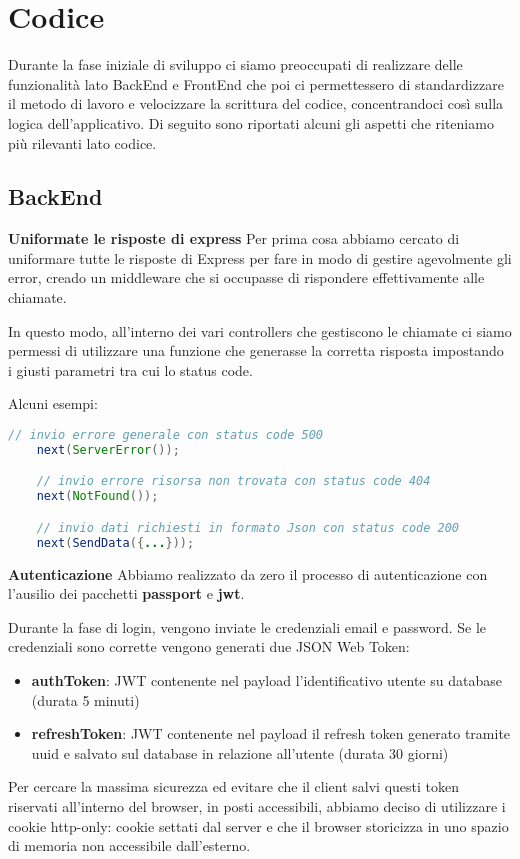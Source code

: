 \section{Codice}
Durante la fase iniziale di sviluppo ci siamo preoccupati di realizzare delle funzionalità lato BackEnd e FrontEnd 
che poi ci permettessero di standardizzare il metodo di lavoro e velocizzare la scrittura del codice,
concentrandoci così sulla logica dell'applicativo.
\bigbreak
\noindent
Di seguito sono riportati alcuni gli aspetti che riteniamo più rilevanti lato codice.

\subsection{BackEnd}

\textbf{Uniformate le risposte di express}
\bigbreak
\noindent
Per prima cosa abbiamo cercato di uniformare tutte le risposte di Express per fare in modo di gestire agevolmente gli error, 
creado un middleware che si occupasse di rispondere effettivamente alle chiamate.

In questo modo, all'interno dei vari controllers che gestiscono le chiamate ci siamo permessi di utilizzare una funzione 
che generasse la corretta risposta impostando i giusti parametri tra cui lo status code.

Alcuni esempi: 

\begin{lstlisting}[language=java]
	// invio errore generale con status code 500
	next(ServerError()); 

	// invio errore risorsa non trovata con status code 404
	next(NotFound());

	// invio dati richiesti in formato Json con status code 200
	next(SendData({...}));
\end{lstlisting}

\bigbreak
\noindent
\textbf{Autenticazione}
\bigbreak
\noindent
Abbiamo realizzato da zero il processo di autenticazione con l'ausilio dei pacchetti \textbf{passport} e \textbf{jwt}.

Durante la fase di login, vengono inviate le credenziali email e password.
Se le credenziali sono corrette vengono generati due JSON Web Token:
\begin{itemize}
	\item \textbf{authToken}: JWT contenente nel payload l'identificativo utente su database (durata 5 minuti)
	\item \textbf{refreshToken}: JWT contenente nel payload il refresh token generato tramite uuid e salvato sul database in relazione all'utente (durata 30 giorni)
\end{itemize}
Per cercare la massima sicurezza ed evitare che il client salvi questi token riservati all'interno del browser, in posti accessibili, 
abbiamo deciso di utilizzare i cookie http-only: cookie settati dal server e che il browser storicizza in uno spazio di memoria non accessibile dall'esterno.

